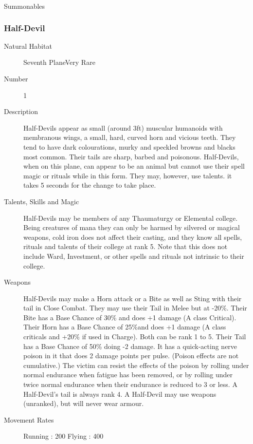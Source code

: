\begin{mmgroup}{Summonables}
\subsubsection{Half-Devil}

\begin{description}
\item[Natural Habitat]Seventh PlaneVery Rare

\item[Number] 1

\item[Description]Half-Devils appear as small (around 3ft) muscular humanoids with
membranous wings, a small, hard, curved horn and vicious teeth.  They
tend to have dark colourations, murky and speckled browns and blacks
most common.  Their tails are sharp, barbed and poisonous.
Half-Devils, when on this plane, can appear to be an animal but cannot
use their spell magic or rituals while in this form.  They may,
however, use talents.  it takes 5 seconds for the change to take
place.

\item[Talents, Skills and Magic]Half-Devils may be members of any Thaumaturgy or Elemental
college.  Being creatures of mana they can only be harmed by silvered
or magical weapons, cold iron does not affect their casting, and they
know all spells, rituals and talents of their college at rank 5.  Note
that this does not include Ward, Investment, or other spells and
rituals not intrinsic to their college.

\item[Weapons]Half-Devils may make a Horn attack or a Bite as well as Sting with
their tail in Close Combat.  They may use their Tail in Melee but at
-20\%.  Their Bite has a Base Chance of 30\% and does +1
damage (A class Critical).  Their Horn has a Base Chance of 25\%and does +1 damage (A class criticals and +20\% if used in
Charge).  Both can be rank 1 to 5. Their Tail has a Base Chance of
50\% doing -2 damage. It has a quick-acting nerve poison in it
that does 2 damage points per pulse. (Poison effects are not
cumulative.)  The victim can resist the effects of the poison by
rolling under normal endurance when fatigue has been removed, or by
rolling under twice normal endurance when their endurance is reduced
to 3 or less.  A Half-Devil's tail is always rank 4.  A Half-Devil may
use weapons (unranked), but will never wear armour.


\item[Movement Rates] Running : 200  Flying : 400


\end{description}
\end{mmgroup}
